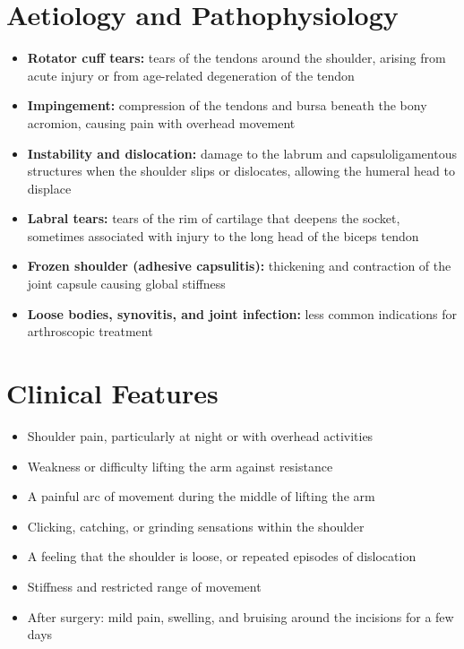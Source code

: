 \section*{Aetiology and Pathophysiology}
\begin{itemize}
    \item \textbf{Rotator cuff tears:} tears of the tendons around the shoulder, arising from acute injury or from age-related degeneration of the tendon
    \item \textbf{Impingement:} compression of the tendons and bursa beneath the bony acromion, causing pain with overhead movement
    \item \textbf{Instability and dislocation:} damage to the labrum and capsuloligamentous structures when the shoulder slips or dislocates, allowing the humeral head to displace
    \item \textbf{Labral tears:} tears of the rim of cartilage that deepens the socket, sometimes associated with injury to the long head of the biceps tendon
    \item \textbf{Frozen shoulder (adhesive capsulitis):} thickening and contraction of the joint capsule causing global stiffness
    \item \textbf{Loose bodies, synovitis, and joint infection:} less common indications for arthroscopic treatment
\end{itemize}

\section*{Clinical Features}
\begin{itemize}
    \item Shoulder pain, particularly at night or with overhead activities
    \item Weakness or difficulty lifting the arm against resistance
    \item A painful arc of movement during the middle of lifting the arm
    \item Clicking, catching, or grinding sensations within the shoulder
    \item A feeling that the shoulder is loose, or repeated episodes of dislocation
    \item Stiffness and restricted range of movement
    \item After surgery: mild pain, swelling, and bruising around the incisions for a few days
\end{itemize}

